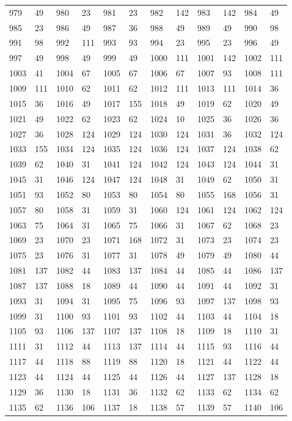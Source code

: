 \begin{longtable}{llllllllllll}
979 & 49&980 &23&981& 23&982 &142&983 &142&984& 49\\
985 & 23&986 &49&987& 36&988 &49&989 &49&990& 98\\
991 & 98&992 &111&993& 93&994 &23&995 &23&996& 49\\
997 & 49&998 &49&999& 49&1000 &111&1001 &142&1002& 111\\
1003 & 41&1004 &67&1005& 67&1006 &67&1007 &93&1008& 111\\
1009 & 111&1010 &62&1011& 62&1012 &111&1013 &111&1014& 36\\
1015 & 36&1016 &49&1017& 155&1018 &49&1019 &62&1020& 49\\
1021 & 49&1022 &62&1023& 62&1024 &10&1025 &36&1026& 36\\
1027 & 36&1028 &124&1029& 124&1030 &124&1031 &36&1032& 124\\
1033 & 155&1034 &124&1035& 124&1036 &124&1037 &124&1038& 62\\
1039 & 62&1040 &31&1041& 124&1042 &124&1043 &124&1044& 31\\
1045 & 31&1046 &124&1047& 124&1048 &31&1049 &62&1050& 31\\
1051 & 93&1052 &80&1053& 80&1054 &80&1055 &168&1056& 31\\
1057 & 80&1058 &31&1059& 31&1060 &124&1061 &124&1062& 124\\
1063 & 75&1064 &31&1065& 75&1066 &31&1067 &62&1068& 23\\
1069 & 23&1070 &23&1071& 168&1072 &31&1073 &23&1074& 23\\
1075 & 23&1076 &31&1077& 31&1078 &49&1079 &49&1080& 44\\
1081 & 137&1082 &44&1083& 137&1084 &44&1085 &44&1086& 137\\
1087 & 137&1088 &18&1089& 44&1090 &44&1091 &44&1092& 31\\
1093 & 31&1094 &31&1095& 75&1096 &93&1097 &137&1098& 93\\
1099 & 31&1100 &93&1101& 93&1102 &44&1103 &44&1104& 18\\
1105 & 93&1106 &137&1107& 137&1108 &18&1109 &18&1110& 31\\
1111 & 31&1112 &44&1113& 137&1114 &44&1115 &93&1116& 44\\
1117 & 44&1118 &88&1119& 88&1120 &18&1121 &44&1122& 44\\
1123 & 44&1124 &44&1125& 44&1126 &44&1127 &137&1128& 18\\
1129 & 36&1130 &18&1131& 36&1132 &62&1133 &62&1134& 62\\
1135 & 62&1136 &106&1137& 18&1138 &57&1139 &57&1140& 106\\

\end{longtable}
